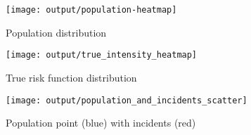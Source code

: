     \centering
    \begin{subfigure}[t]{0.32\textwidth}
    \texttt{[image: output/population-heatmap]}
    \caption{Population distribution}
    \end{subfigure}
    \begin{subfigure}[t]{0.32\textwidth}
    \texttt{[image: output/true\_intensity\_heatmap]}
    \caption{True risk function distribution}
    \end{subfigure}%
    \begin{subfigure}[t]{0.32\textwidth}
    \texttt{[image: output/population\_and\_incidents\_scatter]}
    \caption{Population point (blue) with incidents (red)}
    \end{subfigure}%
